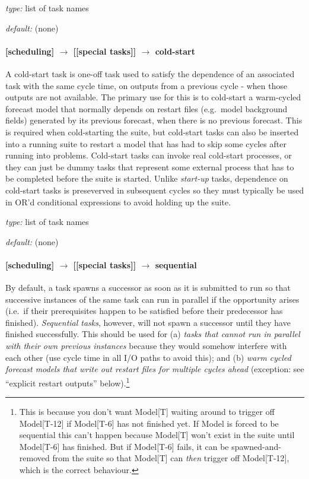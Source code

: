 \begin{myitemize}
    \item {\em type:} list of task names
    \item {\em default:} (none)
\end{myitemize}

\paragraph[cold-start]{[scheduling] $\rightarrow$ [[special tasks]] $\rightarrow$ cold-start}

A cold-start task is one-off task used to satisfy the dependence of an
associated task with the same cycle time, on outputs from a previous
cycle - when those outputs are not available.  The primary use for this
is to cold-start a warm-cycled forecast model that normally depends on
restart files (e.g.\ model background fields) generated by its previous
forecast, when there is no previous forecast.  This is required when
cold-starting the suite, but cold-start tasks can also be inserted into
a running suite to restart a model that has had to skip some cycles
after running into problems. Cold-start tasks can invoke real cold-start
processes, or they can just be dummy tasks that represent some external
process that has to be completed before the suite is started. Unlike
{\em start-up} tasks, dependence on cold-start tasks is preseverved in
subsequent cycles so they must typically be used in OR'd conditional
expressions to avoid holding up the suite.

\begin{myitemize}
    \item {\em type:} list of task names
    \item {\em default:} (none)
\end{myitemize}

\paragraph[sequential]{[scheduling] $\rightarrow$ [[special tasks]] $\rightarrow$ sequential}

By default, a task spawns a successor as soon as it is submitted to run
so that successive instances of the same task can run in parallel if the
opportunity arises (i.e.\ if their prerequisites happen to be satisfied
before their predecessor has finished). {\em Sequential tasks}, however,
will not spawn a successor until they have finished successfully. This
should be used for (a) {\em tasks that cannot run in parallel with their
own previous instances} because they would somehow interfere with each
other (use cycle time in all I/O paths to avoid this); and (b) {\em warm
cycled forecast models that write out restart files for multiple cycles
ahead} (exception: see ``explicit restart outputs''
below).\footnote{This is because you don't want Model[T] waiting around
to trigger off Model[T-12] if Model[T-6] has not finished yet. If Model
is forced to be sequential this can't happen because Model[T] won't
exist in the suite until Model[T-6] has finished. But if Model[T-6]
fails, it can be spawned-and-removed from the suite so that Model[T] can
{\em then} trigger off Model[T-12], which is the correct behaviour.} 

